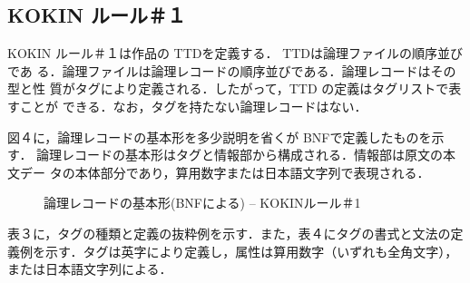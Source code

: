 \subsection{KOKIN ルール＃１}
\label{sec:4.2setu}

KOKIN ルール＃１は作品の TTDを定義する． TTDは論理ファイルの順序並びであ
る．論理ファイルは論理レコードの順序並びである．論理レコードはその型と性
質がタグにより定義される．したがって，TTD の定義はタグリストで表すことが
できる．なお，タグを持たない論理レコードはない．

図４に，論理レコードの基本形を多少説明を省くが BNFで定義したものを示す．
論理レコードの基本形はタグと情報部から構成される．情報部は原文の本文デー
タの本体部分であり，算用数字または日本語文字列で表現される．

\begin{figure}[htbp]
  \begin{center}
    \leavevmode
{}
\vspace*{5mm}

    \caption{論理レコードの基本形(BNFによる) -- KOKINルール＃1}
    \label{fig:4}
  \end{center}
\end{figure}

表３に，タグの種類と定義の抜粋例を示す．また，表４にタグの書式と文法の定
義例を示す．タグは英字により定義し，属性は算用数字（いずれも全角文字），
または日本語文字列による．

